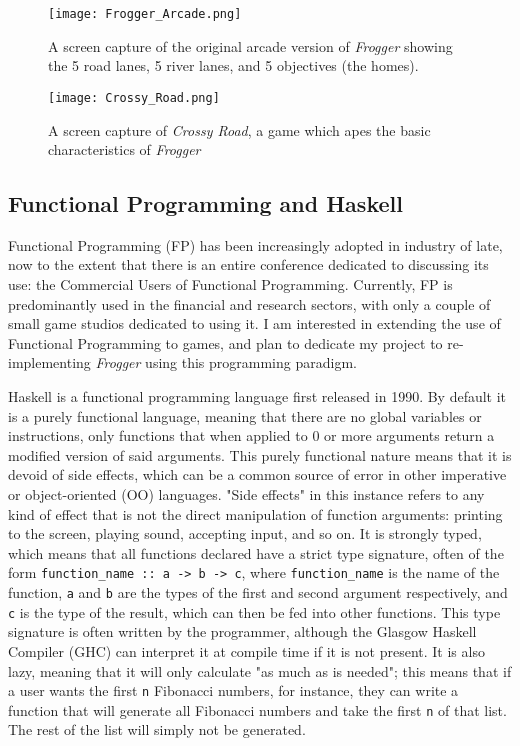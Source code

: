 \documentclass[12pt, a4paper]{report}
\begin{document}
\begin{figure}[ht]
  \centering
  \caption{A screen capture of the original arcade version of \textit{Frogger} showing the 5 road lanes, 5 river lanes, and 5 objectives (the homes).}
  \texttt{[image: Frogger\_Arcade.png]}
  \label{fig:froggerarcade}
\end{figure}
\begin{figure}[ht]
  \centering
  \caption{A screen capture of \textit{Crossy Road}, a game which apes the basic characteristics of \textit{Frogger}}
  \texttt{[image: Crossy\_Road.png]}
  \label{fig:crossyroad}
\end{figure}

\subsection{Functional Programming and Haskell}
Functional Programming (FP) has been increasingly adopted in industry of late, now to the extent that there is an entire conference dedicated to discussing its use: the Commercial Users of Functional Programming\cite{cufp}.
Currently, FP is predominantly used in the financial and research sectors, with only a couple of small game studios dedicated to using it.
I am interested in extending the use of Functional Programming to games, and plan to dedicate my project to re-implementing \textit{Frogger} using this programming paradigm.

\par

Haskell is a functional programming language first released in 1990.
By default it is a purely functional language, meaning that there are no global variables or instructions, only functions that when applied to 0 or more arguments return a modified version of said arguments.
This purely functional nature means that it is devoid of side effects, which can be a common source of error in other imperative or object-oriented (OO) languages.
"Side effects" in this instance refers to any kind of effect that is not the direct manipulation of function arguments: printing to the screen, playing sound, accepting input, and so on.
It is strongly typed\cite{haskellsite}, which means that all functions declared have a strict type signature, often of the form \verb|function_name :: a -> b -> c|, where \verb|function_name| is the name of the function, \verb|a| and \verb|b| are the types of the first and second argument respectively, and \verb|c| is the type of the result, which can then be fed into other functions.
This type signature is often written by the programmer, although the Glasgow Haskell Compiler (GHC) can interpret it at compile time if it is not present.
It is also lazy\cite{haskellsite}, meaning that it will only calculate "as much as is needed"; this means that if a user wants the first \verb|n| Fibonacci numbers, for instance, they can write a function that will generate all Fibonacci numbers and take the first \verb|n| of that list.
The rest of the list will simply not be generated.
\end{document}
